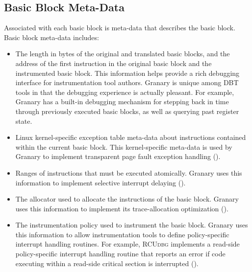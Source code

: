 \documentclass[preprint]{sigplanconf}
\newcommand{\toolname}[1]{{\scshape #1}}
\begin{document}

\subsection{Basic Block Meta-Data}\label{sec:metadata}

Associated with each basic block is meta-data that describes the basic block. Basic block meta-data includes: \begin{itemize}
	\item The length in bytes of the original and translated basic blocks, and the address of the first instruction in the original basic block and the instrumented basic block. This information helps provide a rich debugging interface for instrumentation tool authors. Granary is unique among DBT tools in that the debugging experience is actually pleasant. For example, Granary has a built-in debugging mechanism for stepping back in time through previously executed basic blocks, as well as querying past register state.
	\item Linux kernel-specific exception table meta-data about instructions contained within the current basic block. This kernel-specific meta-data is used by Granary to implement transparent page fault exception handling ().
	\item Ranges of instructions that must be executed atomically. Granary uses this information to implement selective interrupt delaying ().
	\item The allocator used to allocate the instructions of the basic block. Granary uses this information to implement its trace-allocation optimization ().
	\item The instrumentation policy used to instrument the basic block. Granary uses this information to allow instrumentation tools to define policy-specific interrupt handling routines. For example, \toolname{RCUdbg} implements a read-side policy-specific interrupt handling routine that reports an error if code executing within a read-side critical section is interrupted ().
\end{itemize} %
\end{document}
